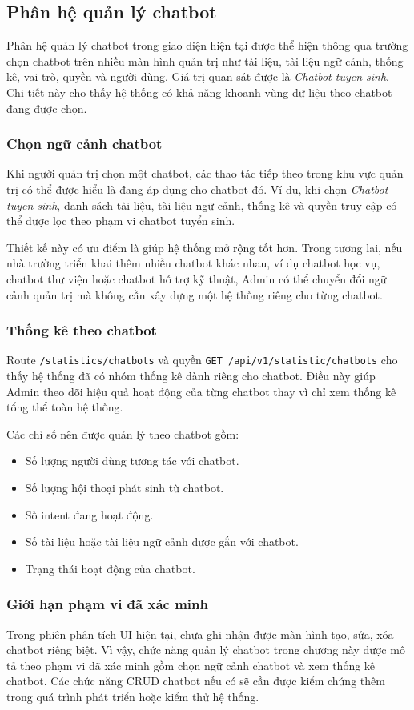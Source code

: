 \subsection{Phân hệ quản lý chatbot}

Phân hệ quản lý chatbot trong giao diện hiện tại được thể hiện thông qua trường chọn chatbot trên nhiều màn hình quản trị như tài liệu, tài liệu ngữ cảnh, thống kê, vai trò, quyền và người dùng. Giá trị quan sát được là \textit{Chatbot tuyen sinh}. Chi tiết này cho thấy hệ thống có khả năng khoanh vùng dữ liệu theo chatbot đang được chọn.

\subsubsection{Chọn ngữ cảnh chatbot}

Khi người quản trị chọn một chatbot, các thao tác tiếp theo trong khu vực quản trị có thể được hiểu là đang áp dụng cho chatbot đó. Ví dụ, khi chọn \textit{Chatbot tuyen sinh}, danh sách tài liệu, tài liệu ngữ cảnh, thống kê và quyền truy cập có thể được lọc theo phạm vi chatbot tuyển sinh.

Thiết kế này có ưu điểm là giúp hệ thống mở rộng tốt hơn. Trong tương lai, nếu nhà trường triển khai thêm nhiều chatbot khác nhau, ví dụ chatbot học vụ, chatbot thư viện hoặc chatbot hỗ trợ kỹ thuật, Admin có thể chuyển đổi ngữ cảnh quản trị mà không cần xây dựng một hệ thống riêng cho từng chatbot.

\subsubsection{Thống kê theo chatbot}

Route \texttt{/statistics/chatbots} và quyền \texttt{GET /api/v1/statistic/chatbots} cho thấy hệ thống đã có nhóm thống kê dành riêng cho chatbot. Điều này giúp Admin theo dõi hiệu quả hoạt động của từng chatbot thay vì chỉ xem thống kê tổng thể toàn hệ thống.

Các chỉ số nên được quản lý theo chatbot gồm:

\begin{itemize}
    \item Số lượng người dùng tương tác với chatbot.
    \item Số lượng hội thoại phát sinh từ chatbot.
    \item Số intent đang hoạt động.
    \item Số tài liệu hoặc tài liệu ngữ cảnh được gắn với chatbot.
    \item Trạng thái hoạt động của chatbot.
\end{itemize}

\subsubsection{Giới hạn phạm vi đã xác minh}

Trong phiên phân tích UI hiện tại, chưa ghi nhận được màn hình tạo, sửa, xóa chatbot riêng biệt. Vì vậy, chức năng quản lý chatbot trong chương này được mô tả theo phạm vi đã xác minh gồm chọn ngữ cảnh chatbot và xem thống kê chatbot. Các chức năng CRUD chatbot nếu có sẽ cần được kiểm chứng thêm trong quá trình phát triển hoặc kiểm thử hệ thống.
